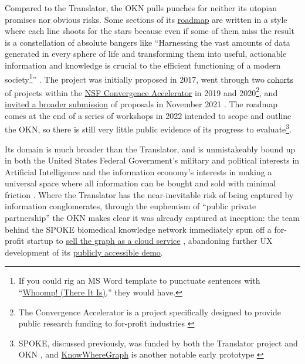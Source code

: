 Compared to the Translator, the OKN pulls punches for neither its
utopian promises nor obvious risks. Some sections of its
\href{https://web.archive.org/web/20221028095757/https://nsf-gov-resources.nsf.gov/2022-09/OKN\%20Roadmap\%20-\%20Report_v03.pdf}{roadmap}
are written in a style where each line shoots for the stars because even
if some of them miss the result is a constellation of absolute bangers
like ``Harnessing the vast amounts of data generated in every sphere of
life and transforming them into useful, actionable information and
knowledge is crucial to the efficient functioning of a modern
society\footnote{If you could rig an MS Word template to punctuate
  sentences with
  ``\href{https://www.youtube.com/watch?v=L6mNa_QZVHg}{Whoomp! (There It
  Is)},'' they would have.}'' \cite{baruOpenKnowledgeNetwork2022} . The project was initially proposed in 2017, went through two
\href{https://beta.nsf.gov/funding/initiatives/convergence-accelerator/portfolio}{cohorts}
of projects within the
\href{https://beta.nsf.gov/funding/initiatives/convergence-accelerator/portfolio}{NSF
Convergence Accelerator} in 2019 and 2020\footnote{The Convergence
  Accelerator is a project specifically designed to provide public
  research funding to for-profit industries \cite{nationalsciencefoundationNSFConvergenceAccelerator2019} }, and
\href{https://www.nsf.gov/pubs/2022/nsf22017/nsf22017.jsp}{invited a
broader submission} of proposals in November 2021 \cite{nationalsciencefoundationNSF22017Dear2021} . The roadmap comes at the
end of a series of workshops in 2022 intended to scope and outline the
OKN, so there is still very little public evidence of its progress to
evaluate\footnote{SPOKE, discussed previously, was funded by both the
  Translator project \cite{huangNIH1OT2TR00345001EVIDARA2020} 
  and OKN \cite{baranziniNSFAwardSearch2022} , and
  \href{https://knowwheregraph.org/}{KnowWhereGraph} is another notable
  early prototype \cite{janowiczKnowKnowWhere2022} }.

Its domain is much broader than the Translator, and is unmistakeably
bound up in both the United States Federal Government's military and
political interests in Artificial Intelligence \cite{nationalsecuritycommissiononartificialintelligenceFinalReport2021} 
and the information economy's interests in making a universal space
where all information can be bought and sold with minimal friction \cite{bigdatainteragencyworkinggroupOpenKnowledgeNetwork2018} . Where
the Translator has the near-inevitable risk of being captured by
information conglomerates, through the euphemism of ``public private
partnership'' the OKN makes clear it was already captured at inception:
the team behind the SPOKE biomedical knowledge network immediately spun
off a for-profit startup to
\href{https://www.matebioservices.com/spoke-cloud}{sell the graph as a
cloud service} \cite{matebioservicesinc.SPOKECloud2021} ,
abandoning further UX development of its
\href{https://spoke.rbvi.ucsf.edu/}{publicly accessible demo}.


